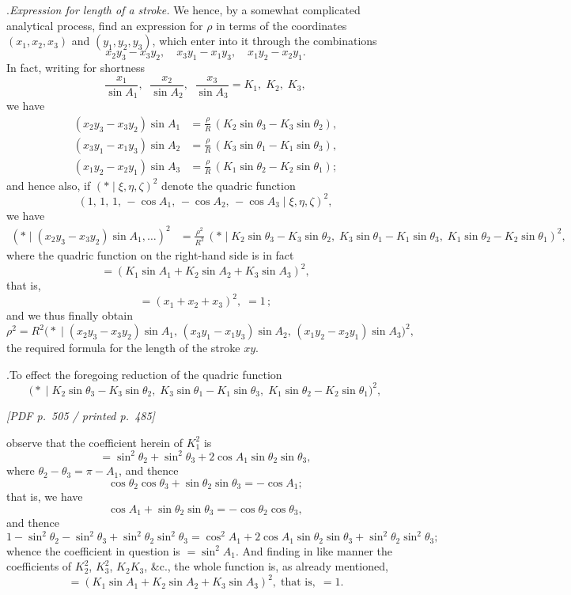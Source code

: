 \documentclass[11pt]{article}
\begin{document}
.\quad \textit{Expression for length of a stroke.} We hence, by a somewhat complicated analytical process, find an expression for $\rho$ in terms of the coordinates $(x_{1}, x_{2}, x_{3})$ and $(y_{1}, y_{2}, y_{3})$, which enter into it through the combinations
\[
x_{2}y_{3} - x_{3}y_{2},\quad x_{3}y_{1} - x_{1}y_{3},\quad x_{1}y_{2} - x_{2}y_{1}.
\]
In fact, writing for shortness
\[
\frac{x_{1}}{\sin A_{1}},\;\;\frac{x_{2}}{\sin A_{2}},\;\;\frac{x_{3}}{\sin A_{3}} = K_{1},\;K_{2},\;K_{3},
\]
we have
\begin{align*}
(x_{2}y_{3} - x_{3}y_{2})\sin A_{1} &= \frac{\rho}{R}\,(K_{2}\sin\theta_{3} - K_{3}\sin\theta_{2}), \\
(x_{3}y_{1} - x_{1}y_{3})\sin A_{2} &= \frac{\rho}{R}\,(K_{3}\sin\theta_{1} - K_{1}\sin\theta_{3}), \\
(x_{1}y_{2} - x_{2}y_{1})\sin A_{3} &= \frac{\rho}{R}\,(K_{1}\sin\theta_{2} - K_{2}\sin\theta_{1});
\end{align*}
and hence also, if $(*\!\mid\xi, \eta, \zeta)^{2}$ denote the quadric function
\[
(1,\,1,\,1,\,-\cos A_{1},\,-\cos A_{2},\,-\cos A_{3}\mid \xi,\eta,\zeta)^{2},
\]
we have
\begin{align*}
(*\!\mid(x_{2}y_{3} - x_{3}y_{2})\sin A_{1}, \ldots)^{2}
&= \frac{\rho^{2}}{R^{2}}\,(*\!\mid K_{2}\sin\theta_{3} - K_{3}\sin\theta_{2},\; K_{3}\sin\theta_{1} - K_{1}\sin\theta_{3},\; K_{1}\sin\theta_{2} - K_{2}\sin\theta_{1})^{2},
\end{align*}
where the quadric function on the right-hand side is in fact
\[
= (K_{1}\sin A_{1} + K_{2}\sin A_{2} + K_{3}\sin A_{3})^{2},
\]
that is,
\[
= (x_{1} + x_{2} + x_{3})^{2},\;= 1\,;
\]
and we thus finally obtain
\[
\rho^{2} = R^{2}\bigl(*\!\mid(x_{2}y_{3} - x_{3}y_{2})\sin A_{1},\,(x_{3}y_{1} - x_{1}y_{3})\sin A_{2},\,(x_{1}y_{2} - x_{2}y_{1})\sin A_{3}\bigr)^{2},
\]
the required formula for the length of the stroke $xy$.

\medskip

.\quad To effect the foregoing reduction of the quadric function
\[
\bigl(*\!\mid K_{2}\sin\theta_{3} - K_{3}\sin\theta_{2},\;K_{3}\sin\theta_{1} - K_{1}\sin\theta_{3},\;K_{1}\sin\theta_{2} - K_{2}\sin\theta_{1}\bigr)^{2},
\]

\vfill
\noindent\textit{[PDF p.~505 / printed p.~485]}
\newpage

\noindent observe that the coefficient herein of $K_{1}^{2}$ is
\[
= \sin^{2}\theta_{2} + \sin^{2}\theta_{3} + 2\cos A_{1}\sin\theta_{2}\sin\theta_{3},
\]
where $\theta_{2} - \theta_{3} = \pi - A_{1}$, and thence
\[
\cos\theta_{2}\cos\theta_{3} + \sin\theta_{2}\sin\theta_{3} = -\cos A_{1};
\]
that is, we have
\[
\cos A_{1} + \sin\theta_{2}\sin\theta_{3} = -\cos\theta_{2}\cos\theta_{3},
\]
and thence
\[
1 - \sin^{2}\theta_{2} - \sin^{2}\theta_{3} + \sin^{2}\theta_{2}\sin^{2}\theta_{3} = \cos^{2}A_{1} + 2\cos A_{1}\sin\theta_{2}\sin\theta_{3} + \sin^{2}\theta_{2}\sin^{2}\theta_{3};
\]
whence the coefficient in question is $= \sin^{2}A_{1}$. And finding in like manner the coefficients of $K_{2}^{2}$, $K_{3}^{2}$, $K_{2}K_{3}$, \&c., the whole function is, as already mentioned,
\[
= (K_{1}\sin A_{1} + K_{2}\sin A_{2} + K_{3}\sin A_{3})^{2},\;\text{that is},\;= 1.
\]
\end{document}
